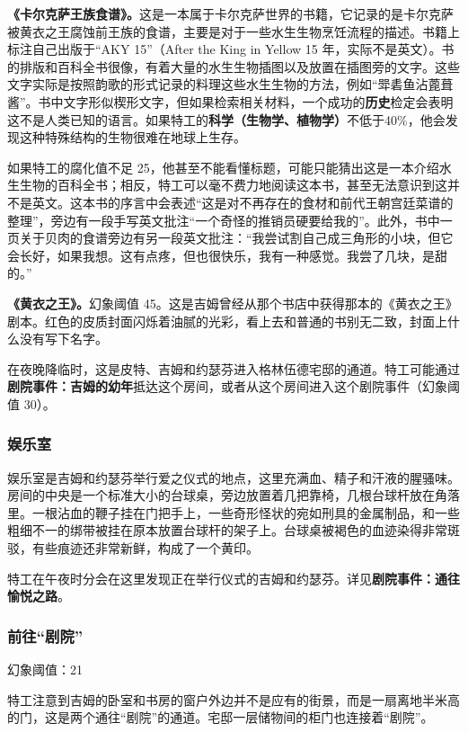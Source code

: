 \textbf{《卡尔克萨王族食谱》。}这是一本属于卡尔克萨世界的书籍，它记录的是卡尔克萨被黄衣之王腐蚀前王族的食谱，主要是对于一些水生生物烹饪流程的描述。书籍上标注自己出版于“AKY 15”（After the King in Yellow 15 年，实际不是英文）。书的排版和百科全书很像，有着大量的水生生物插图以及放置在插图旁的文字。这些文字实际是按照韵歌的形式记录的料理这些水生生物的方法，例如“斝砉鱼沾蓖葺酱”。书中文字形似楔形文字，但如果检索相关材料，一个成功的\textbf{历史}检定会表明这不是人类已知的语言。如果特工的\textbf{科学（生物学、植物学）}不低于40\%，他会发现这种特殊结构的生物很难在地球上生存。

如果特工的腐化值不足 25，他甚至不能看懂标题，可能只能猜出这是一本介绍水生生物的百科全书；相反，特工可以毫不费力地阅读这本书，甚至无法意识到这并不是英文。这本书的序言中会表述“这是对不再存在的食材和前代王朝宫廷菜谱的整理”，旁边有一段手写英文批注“一个奇怪的推销员硬要给我的”。此外，书中一页关于贝肉的食谱旁边有另一段英文批注：“我尝试割自己成三角形的小块，但它会长好，如果我想。这有点疼，但也很快乐，我有一种感觉。我尝了几块，是甜的。”

\textbf{《黄衣之王》。}幻象阈值 45。这是吉姆曾经从那个书店中获得那本的《黄衣之王》剧本。红色的皮质封面闪烁着油腻的光彩，看上去和普通的书别无二致，封面上什么没有写下名字。

在夜晚降临时，这是皮特、吉姆和约瑟芬进入格林伍德宅邸的通道。特工可能通过\textbf{剧院事件：吉姆的幼年}抵达这个房间，或者从这个房间进入这个剧院事件（幻象阈值 30）。

\subsubsection{娱乐室}
娱乐室是吉姆和约瑟芬举行爱之仪式的地点，这里充满血、精子和汗液的腥骚味。房间的中央是一个标准大小的台球桌，旁边放置着几把靠椅，几根台球杆放在角落里。一根沾血的鞭子挂在门把手上，一些奇形怪状的宛如刑具的金属制品，和一些粗细不一的绑带被挂在原本放置台球杆的架子上。台球桌被褐色的血迹染得非常斑驳，有些痕迹还非常新鲜，构成了一个黄印。

特工在午夜时分会在这里发现正在举行仪式的吉姆和约瑟芬。详见\textbf{剧院事件：通往愉悦之路}。

\subsubsection{前往“剧院”}
幻象阈值：21

特工注意到吉姆的卧室和书房的窗户外边并不是应有的街景，而是一扇离地半米高的门，这是两个通往“剧院”的通道。宅邸一层储物间的柜门也连接着“剧院”。